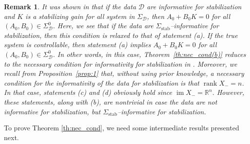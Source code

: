 \documentclass[9pt,shortpaper,twoside,web]{ieeecolor}
\DeclareMathOperator{\rank}{rank}
\DeclareMathOperator{\im}{im}
\newtheorem{remark}[theorem]{Remark}
\begin{document}
\begin{remark}
It was shown in \cite[Lem. 15]{van2020data} that if the data $\mathcal{D}$ are informative for stabilization and $K$ is a stabilizing gain for all system in $\Sigma_\mathcal{D}$, then $A_0+B_0K=0$ for all \mbox{$(A_0,B_0)\in\Sigma_\mathcal{D}^0$}. Here, we see that if the data are \mbox{$\Sigma_\text{stab}$--informative} for stabilization, then this condition is relaxed to that of statement (a). If the true system is controllable, then statement (a) implies \mbox{$A_0+B_0K=0$} for all $(A_0,B_0) \in \Sigma_{\mathcal{D}}^0$. In other words, in this case, Theorem~\ref{th:nec_cond(b)} reduces to the necessary condition for informativity for stabilization in \cite[Lem. 15]{van2020data}. Moreover, we recall from Proposition~\ref{prop:1} that, without using prior knowledge, a necessary condition for the informativity of the data for stabilization is that $\rank X_-=n$. In that case, statements (c) and (d) obviously hold since $\im X_-=\mathbb{R}^n$. However, these statements, along with (b), are nontrivial in case the data are not informative for stabilization, but \mbox{$\Sigma_\text{stab}$--informative} for stabilization. 
\end{remark}

To prove Theorem \ref{th:nec_cond}, we need some intermediate results presented next. 
\end{document}
